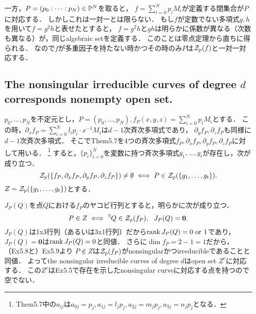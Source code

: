 \documentclass[a4paper]{jsarticle}
\begin{document}
    一方，$P=(p_0:\dots:p_N) \in \mathbb{P}^N$を取ると，
    $f=\sum_{i=0}^{N}p_i M_i$が定義する閉集合が$P$に対応する．
    しかしこれは一対一とは限らない．
    もし$f$が定数でない多項式$g,h$を用いて$f=g^2 h$と表せたとすると，
    $f=g^2 h$と$gh$は明らかに係数が異なる（次数も異なる）が，同じalgebraic setを定義する．
    このことは零点定理から直ちに得られる．
    なので$f$が多重因子を持たない時かつその時のみ$P$は$\mathcal{Z}_p(f)$と一対一対応する．

    \subsection{The nonsingular irreducible curves of degree $d$ corresponds nonempty open set.}
    $p_0,\dots,p_N$を不定元とし，$P=(p_0,\dots,p_N), f_P(x,y,z)=\sum_{i=0}^{N}p_i M_i$とする．
    この時，$\partial_x f_P=\sum_{i=0}^{N} l_i p_i \cdot x^{-1} M_i$は$d-1$次斉次多項式であり，
    $\partial_y f_P, \partial_z f_P$も同様に$d-1$次斉次多項式．
    そこでThem5.7を4つの斉次多項式$f_P, \partial_x f_P, \partial_y f_P, \partial_z f_P$に対して用いる．
    \footnote{Them5.7中の$a_{ij}$は$a_{0j}=p_j, a_{1j}=l_j p_j, a_{2j}=m_j p_j,a_{3j}=n_j p_j$となる．}
    すると，$\{p_i\}_{i=0}^N$を変数に持つ斉次多項式$g_1,\dots,g_t$が存在し，次が成り立つ．
    \[ \mathcal{Z}_p(\{f_P, \partial_x f_P, \partial_y f_P, \partial_z f_P\}) \neq \emptyset \iff P \in \mathcal{Z}_p(\{g_1,\dots,g_t\}). \]
    $Z=\mathcal{Z}_p(\{g_1,\dots,g_t\})$とする．

    $J_P(Q)$を点$Q$における$f_P$のヤコビ行列とすると，明らかに次が成り立つ．
    \[ P \in Z \iff {}^{\exists} Q \in \mathcal{Z}_p(f_P),~~ J_P(Q)=\mathbf{0}. \]
    $J_P(Q)$は1x3行列（あるいは3x1行列）だから$\operatorname{rank} J_P(Q)=0 \text{ or } 1$であり，
    $J_P(Q)=\mathbf{0}$は$\operatorname{rank} J_P(Q)=0$と同値．
    さらに$\dim f_P=2-1=1$だから，（Ex5.8と）Ex5.9より
    $P \not \in Z$は$\mathcal{Z}_p(f_P)$がnonsingularかつirreducibleであることと同値．
    よってthe nonsingular irreducible curves of degree $d$はopen set $Z^c$に対応する．
    この$Z^c$はEx5.5で存在を示したnonsingular curveに対応する点を持つので空でない．
\end{document}
